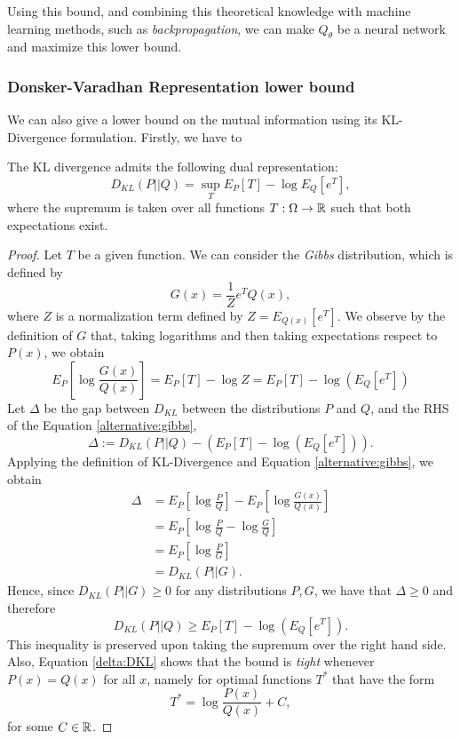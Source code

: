 Using this bound, and combining this theoretical knowledge with machine learning methods, such as \emph{backpropagation}, we can make $Q_\theta$ be a neural network and maximize this lower bound.

\subsubsection{Donsker-Varadhan Representation lower bound}

We can also give a lower bound on the mutual information using its KL-Divergence formulation. Firstly, we have to 

\begin{nth}
The KL divergence admits the following dual representation:
\[
D_{KL}(P || Q) = \sup_{T} E_P[T] - \log E_Q\left[e^T\right],
\]
where the supremum is taken over all functions $T:\Omega \to \mathbb{R}$ such that both expectations exist.
\end{nth}
\begin{proof}
    Let $T$ be a given function. We can consider the \emph{Gibbs} distribution, which is defined by
    \[
    G(x) = \frac{1}{Z}e^T Q(x),
    \]
    where $Z$ is a normalization term defined by $Z = E_{Q(x)}[e^T]$. We observe by the definition of $G$ that, taking logarithms and then taking expectations respect to $P(x)$, we obtain
    \begin{equation}\label{alternative:gibbs}
    E_{P}\left[ \log \frac{G(x)}{Q(x)}\right] = E_{P}[T] - \log Z = E_P[T] - \log \left( E_Q\left[e^T\right]\right)
    \end{equation}
    Let $\Delta$ be the gap between $D_{KL}$ between the distributions $P$ and $Q$, and the RHS of the Equation \eqref{alternative:gibbs},
    \[
    \Delta := D_{KL}(P||Q) - \left( E_{P}[T] - \log(E_Q\left[e^T\right])\right).
    \]
    Applying the definition of KL-Divergence and Equation \eqref{alternative:gibbs}, we obtain
    \begin{align}
    \Delta & = E_{P}\left[\log \frac{P}{Q}\right] - E_{P}\left[ \log \frac{G(x)}{Q(x)}\right] \nonumber \\
    & = E_P \left[\log \frac{P}{Q} - \log \frac{G}{Q}\right] \nonumber \\
    & = E_P\left[\log \frac{P}{G}\right] \nonumber \\
    & = D_{KL}(P||G) \label{delta:DKL}.
    \end{align}
    Hence, since $D_{KL}(P||G) \geq 0$ for any distributions $P,G$, we have that $\Delta \geq 0$ and therefore
    \[
    D_{KL}(P||Q) \geq E_P[T] - \log \left(E_Q\left[e^T\right]\right). 
    \]
    This inequality is preserved upon taking the supremum over the right hand side. Also, Equation \eqref{delta:DKL} shows that the bound is \emph{tight} whenever $P(x) = Q(x)$ for all $x$, namely for optimal functions $T^*$ that have the form
    \[
    T^* = \log \frac{P(x)}{Q(x)} + C,    
    \]
    for some $C \in \mathbb{R}$.
    
\end{proof}

